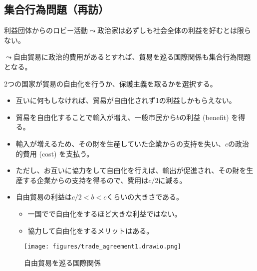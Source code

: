 \documentclass[
  xelatex,
  ja=standard]{bxjsarticle}
\providecommand{\tightlist}{%
  \setlength{\itemsep}{0pt}\setlength{\parskip}{0pt}}\usepackage{longtable,booktabs,array}
\begin{document}
\hypertarget{ux96c6ux5408ux884cux70baux554fux984cux518dux8a2a}{%
\subsection{集合行為問題（再訪）}\label{ux96c6ux5408ux884cux70baux554fux984cux518dux8a2a}}

利益団体からのロビー活動\(\leadsto\)政治家は必ずしも社会全体の利益を好むとは限らない。

\(\leadsto\)自由貿易に政治的費用があるとすれば、貿易を巡る国際関係も集合行為問題となる。

\begin{tcolorbox}[enhanced jigsaw, toprule=.15mm, leftrule=.75mm, coltitle=black, opacityback=0, colback=white, title=\textcolor{quarto-callout-tip-color}{\faLightbulb}\hspace{0.5em}{自由貿易を巡る国際関係}, rightrule=.15mm, bottomrule=.15mm, colbacktitle=quarto-callout-tip-color!10!white, opacitybacktitle=0.6, titlerule=0mm, colframe=quarto-callout-tip-color-frame, bottomtitle=1mm, toptitle=1mm, arc=.35mm, left=2mm, breakable]

2つの国家が貿易の自由化を行うか、保護主義を取るかを選択する。

\begin{itemize}
\tightlist
\item
  互いに何もしなければ、貿易が自由化されず1の利益しかもらえない。
\item
  貿易を自由化することで輸入が増え、一般市民から\(b\)の利益 (benefit)
  を得る。
\item
  輸入が増えるため、その財を生産していた企業からの支持を失い、\(c\)の政治的費用
  (cost) を支払う。
\item
  ただし、お互いに協力をして自由化を行えば、輸出が促進され、その財を生産する企業からの支持を得るので、費用は\(c/2\)に減る。
\item
  自由貿易の利益は\(c/2 < b < c\)くらいの大きさである。

  \begin{itemize}
  \tightlist
  \item
    一国でで自由化をするほど大きな利益ではない。
  \item
    協力して自由化をするメリットはある。
  \end{itemize}
\end{itemize}

\end{tcolorbox}

\begin{figure}[htpb]

{\centering \texttt{[image: figures/trade\_agreement1.drawio.png]}

}

\caption{自由貿易を巡る国際関係}

\end{figure}
\end{document}
